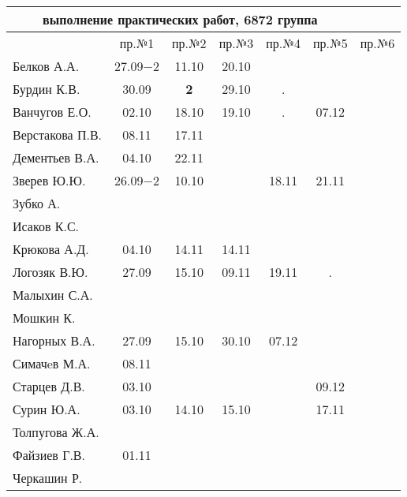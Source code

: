 \documentclass[a4paper,landscape,11pt]{article}
\begin{document}
\newpage
\begin{tabular}{l|cccccc}
\multicolumn{6}{c}{выполнение практических работ, 6872 группа} \\
\toprule
               & пр.№1   & пр.№2 &пр.№3&пр.№4&пр.№5&пр.№6\\
\midrule
Белков А.А.    &27.09$-2$&11.10  &20.10&     &     &\\   
Бурдин К.В.    &30.09    &{\bf 2}&29.10& .   &     &\\
Ванчугов Е.О.  &02.10    &18.10  &19.10& .   &07.12&\\
Верстакова П.В.&08.11    &17.11  &     &     &     &\\
Дементьев В.А. &04.10    &22.11  &     &     &     &\\
Зверев Ю.Ю.    &26.09$-2$&10.10  &     &18.11&21.11&\\
Зубко А.       &         &       &     &     &     &\\
Исаков К.С.    &         &       &     &     &     &\\
Крюкова А.Д.   &04.10    &14.11  &14.11&     &     &\\
Логозяк В.Ю.   &27.09    &15.10  &09.11&19.11&.    &\\
Малыхин С.А.   &         &       &     &     &     &\\
Мошкин К.      &         &       &     &     &     &\\
Нагорных В.А.  &27.09    &15.10  &30.10&07.12&     &\\
Симачeв М.А.   &08.11    &       &     &     &     &\\
Старцев Д.В.   &03.10    &       &     &     &09.12&\\
Сурин Ю.А.     &03.10    &14.10  &15.10&     &17.11&\\
Толпугова Ж.А. &         &       &     &     &     &\\
Файзиев Г.В.   &01.11    &       &     &     &     &\\
Черкашин Р.    &         &       &     &     &     &\\
\bottomrule
\end{tabular}
\end{document}
